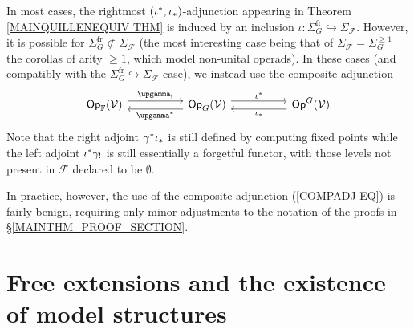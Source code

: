 \documentclass[a4paper,10pt]{article}%
\begin{document}
\begin{remark}\label{COMPADJ REM}
	In most cases, the rightmost $(\iota^{\**},\iota_{\**})$-adjunction appearing in Theorem \ref{MAINQUILLENEQUIV THM}
	is induced by an inclusion 
	$\iota \colon \Sigma_G^{\text{fr}} \hookrightarrow \Sigma_{\mathcal{F}}$.
	However, it is possible for  
	$\Sigma_G^{\text{fr}} \nsubset \Sigma_{\mathcal{F}}$ (the most interesting case being that of
	$\Sigma_{\mathcal F} = \Sigma_{G}^{\geq 1}$
	the corollas of arity $\geq 1$, which model non-unital operads).
	In these cases (and compatibly with the 
	$\Sigma_G^{\text{fr}} \hookrightarrow \Sigma_{\mathcal{F}}$ case), we instead use the composite adjunction
\begin{equation}\label{COMPADJ EQ}
\begin{tikzcd}[column sep =5em]
	\mathsf{Op}_\F(\mathcal{V})
	\ar[shift left=1.5]{r}{\upgamma_!} 
&
	\mathsf{Op}_{G}(\mathcal{V}) 
	\arrow[l, shift left=1.5, "\upgamma^{\**}"] 
	\arrow[r, shift left=1.5,swap,"\iota^{\**}"']
&
	\mathsf{Op}^G(\mathcal{V})
	\ar[shift left=1.5]{l}{\iota_{\**}}
\end{tikzcd}
\end{equation}
Note that the right adjoint 
$\gamma^{\**} \iota_{\**}$
is still defined by computing fixed points while the 
left adjoint
$\iota^{\**}\gamma_!$
is still essentially a forgetful functor, with those levels not present in $\mathcal{F}$ declared to be $\emptyset$.

In practice, however, the use of the composite adjunction
(\ref{COMPADJ EQ})
is fairly benign, requiring only minor
adjustments to the notation of the proofs in 
\S \ref{MAINTHM_PROOF_SECTION}.
\end{remark}

%        




\renewcommand{\F}{\mathbb{F}}

\section{Free extensions and the existence of model structures}
\label{FREE_EXTENSIONS_SECTION}
\end{document}
